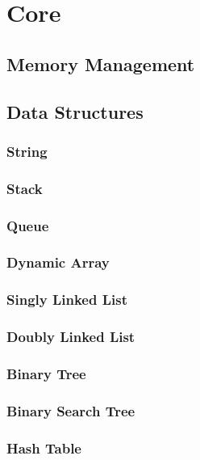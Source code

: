 \documentclass[a4paper,oneside]{article}
\begin{document}
\section{Core}

\subsection{Memory Management}

\subsection{Data Structures}

\subsubsection{String}

\subsubsection{Stack}

\subsubsection{Queue}

\subsubsection{Dynamic Array}

\subsubsection{Singly Linked List}

\subsubsection{Doubly Linked List}

\subsubsection{Binary Tree}

\subsubsection{Binary Search Tree}

\subsubsection{Hash Table}
\end{document}
